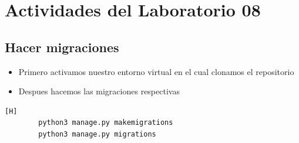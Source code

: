 \documentclass{article}
\begin{document}
	\section{Actividades del Laboratorio 08}
	\subsection{Hacer migraciones}
	\begin{itemize}	
        \item Primero activamos nuestro entorno virtual en el cual clonamos el repositorio
		\item Despues hacemos las migraciones respectivas
	\end{itemize}	
    \begin{lstlisting}[language=bash,caption={migraciones}][H]
        python3 manage.py makemigrations
        python3 manage.py migrations
	\end{lstlisting}
\end{document}
